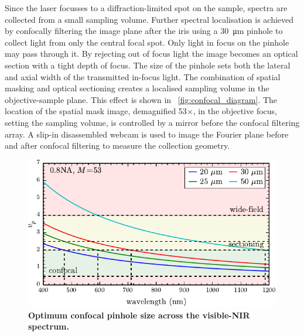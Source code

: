 \documentclass{article}
\begin{document}
Since the laser focusses to a diffraction-limited spot on the sample, spectra are collected from a small sampling volume. Further spectral localisation is achieved by confocally filtering the image plane after the iris using a \SI{30}{\micro\metre} pinhole to collect light from only the central focal spot. Only light in focus on the pinhole may pass through it. By rejecting out of focus light the image becomes an optical section with a tight depth of focus. The size of the pinhole sets both the lateral and axial width of the transmitted in-focus light. The combination of spatial masking and optical sectioning creates a localised sampling volume in the objective-sample plane. This effect is shown in \figurename~\ref{fig:confocal_diagram}. The location of the spatial mask image, demagnified 53$\times$, in the objective focus, setting the sampling volume, is controlled by a mirror before the confocal filtering array. A slip-in disassembled webcam is used to image the Fourier plane before and after confocal filtering to measure the collection geometry. %

\begin{figure}[bt]
\centering
\includegraphics{figures/confocal_pinhole_choice}
\caption[Optimum confocal pinhole size across the visible-NIR spectrum]{\textbf{Optimum confocal pinhole size across the visible-NIR spectrum.}}
\label{fig:confocal_pinhole_choice}
\end{figure}
\end{document}
